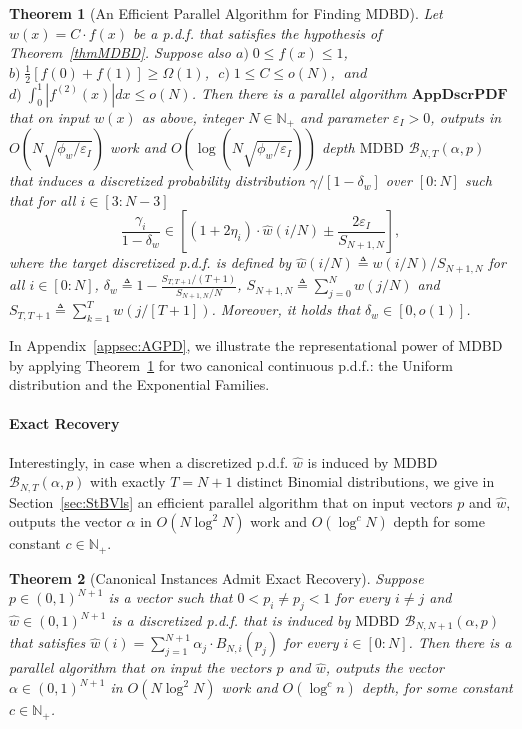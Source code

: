 \documentclass[11pt]{article}
\newcommand{\phiw}{\phi_{w}}
\newcommand{\epsI}{\eps_{I}}
\newcommand{\MDBD}{\mathrm{MDBD}}
\newcommand{\BNTap}{\mathcal{B}_{N,T}(\alpha,p)}
\newcommand{\AppDscrPDF}{\mathrm{\mathbf{AppDscrPDF}}}
\newcommand{\hw}{\widehat{w}}
\newcommand{\N}{\mathbb{N}}
\newcommand{\eps}{\epsilon}
\renewcommand{\leq}{\leqslant}
\renewcommand{\geq}{\geqslant}
\renewcommand{\eps}{\varepsilon}
\newtheorem{thm}{Theorem}  \newtheorem{fact}[thm]{Fact}
\numberwithin{thm}{section}
\begin{document}
\begin{thm}[An Efficient Parallel Algorithm for Finding $\MDBD$]\label{thm_AppDscrPDF}
Let $w(x)=C\cdot f(x)$ be a p.d.f. that satisfies the hypothesis of Theorem~\ref{thmMDBD}. Suppose also $a)\;0\leq f(x)\leq1$,\,\,\,\,$b)\;\frac{1}{2}[f(0)+f(1)] \geq \Omega(1)$,\,\,\,\,$c)\;1\leq C\leq o(N)$,\,\,\,\,$ and $\,\,\,\,$d)\;\int_{0}^{1}\left|f^{(2)}(x)\right|dx\leq o(N)$. Then there is a parallel algorithm $\AppDscrPDF$ that on input $w(x)$ as above, integer $N\in\N_+$ and parameter $\eps_{I}>0$, outputs in $O(N\sqrt{\phiw/\epsI})$ work and $O(\log(N\sqrt{\phiw/\epsI}))$ depth $\MDBD$ $\BNTap$ that induces a discretized probability distribution $\gamma/[1-\delta_w]$ over $[0:N]$ such that for all $i\in[3:N-3]$
\[
\frac{\gamma_{i}}{1-\delta_{w}}\in \left[(1+2\eta_{i})\cdot\hw(i/N) \pm \frac{2\eps_{I}}{S_{N+1,N}}\right],
\]
where the target discretized p.d.f. is defined by $\hw(i/N)\triangleq w(i/N)/S_{N+1,N}$ for all $i\in[0:N]$, $\delta_w\triangleq 1-\frac{S_{T,T+1}/(T+1)}{S_{N+1,N}/N}$, $S_{N+1,N}\triangleq\sum_{j=0}^{N}w(j/N)$ and $S_{T,T+1}\triangleq\sum_{k=1}^{T}w(j/[T+1])$. Moreover, it holds that $\delta_w\in[0,o(1)]$.
\end{thm}

In Appendix~\ref{appsec:AGPD}, we illustrate the representational power of $\MDBD$ by applying Theorem~\ref{thm_AppDscrPDF} for two canonical continuous p.d.f.: the Uniform distribution and the Exponential Families.

\paragraph*{Exact Recovery}
Interestingly, in case when a discretized p.d.f. $\hw$ is induced by $\MDBD$ $\BNTap$ with exactly $T=N+1$ distinct Binomial distributions, we give in Section~\ref{sec:StBVls} an efficient parallel algorithm that on input vectors $p$ and $\hw$, outputs the vector $\alpha$ in $O(N\log^{2}N)$ work and $O(\log^{c}N)$ depth for some constant $c\in\N_+$.

\begin{thm}[Canonical Instances Admit Exact Recovery]\label{thm_my_Inv_Bnp}
Suppose $p\in(0,1)^{N+1}$ is a vector
such that $0<p_{i}\neq p_{j}<1$ for every $i\neq j$ and $\hw\in(0,1)^{N+1}$ is a discretized p.d.f. that is induced by $\MDBD$ $\mathcal{B}_{N,N+1}(\alpha,p)$
that satisfies $\hw(i)=\sum_{j=1}^{N+1}\alpha_{j}\cdot B_{N,i}(p_{j})$
for every $i\in[0:N]$. Then there is a parallel algorithm that
on input the vectors $p$ and $\hw$, outputs the vector $\alpha\in(0,1)^{N+1}$ in $O(N\log^{2}N)$ work and $O(\log^{c}n)$ depth, for some constant $c\in\N_+$.
\end{thm}
\end{document}
